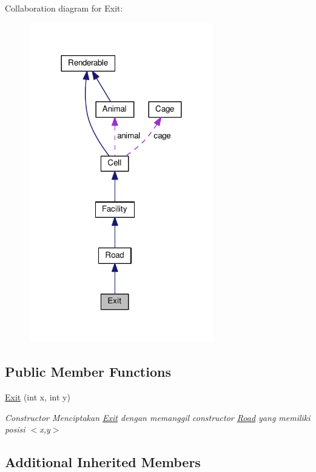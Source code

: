 Collaboration diagram for Exit\+:
\nopagebreak
\begin{figure}[H]
\begin{center}
\leavevmode
\includegraphics[width=228pt]{classExit__coll__graph}
\end{center}
\end{figure}
\subsection*{Public Member Functions}
\begin{DoxyCompactItemize}
\item 
\hyperlink{classExit_abb37d76b2e66fac8cac92fd61dfee563}{Exit} (int x, int y)
\begin{DoxyCompactList}\small\item\em Constructor Menciptakan \hyperlink{classExit}{Exit} dengan memanggil constructor \hyperlink{classRoad}{Road} yang memiliki posisi $<$x,y$>$ \end{DoxyCompactList}\end{DoxyCompactItemize}
\subsection*{Additional Inherited Members}


